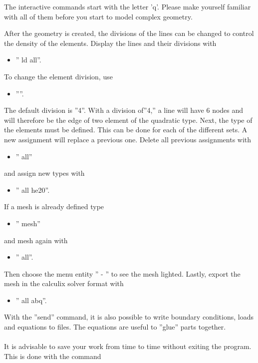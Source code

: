 \documentclass{article}
\begin{document}
The interactive commands start with the letter 'q'. Please make yourself familiar with all of them before you start to model complex geometry.

After the geometry is created, the divisions of the lines can be changed to control the density of the elements.  Display the lines and their divisions with 
\begin{itemize}
\item '' ld all''.
\end{itemize}
To change the element division, use 
\begin{itemize}
\item ''''.
\end{itemize}
The default division is ''4''. With a division of''4,'' a line will have 6 nodes and will therefore be the edge of two element of the quadratic type. Next, the type of the elements must be defined. This can be done for each of the different sets. A new assignment will replace a previous one. Delete all previous assignments with
\begin{itemize}
\item '' all''
\end{itemize}
and assign new types with
\begin{itemize}
\item '' all he20''.
\end{itemize}
If a mesh is already defined type
\begin{itemize}
\item '' mesh''
\end{itemize}
and mesh again with
\begin{itemize}
\item '' all''.
\end{itemize}
Then choose the menu entity '' - '' to see the mesh lighted. Lastly, export the mesh in the calculix solver format with
\begin{itemize}
\item '' all abq''.
\end{itemize}
With the ''send'' command, it is also possible to write boundary conditions, loads and equations to files. The equations are useful to ''glue'' parts together.\\\\It is advisable to save your work from time to time without exiting the program. This is done with the command
\end{document}
